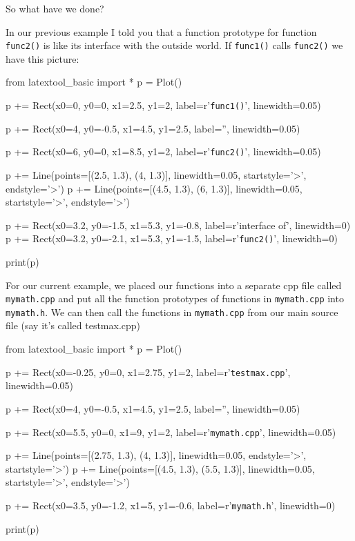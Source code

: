 
So what have we done?

In our previous example I told you that a function prototype for
function \texttt{func2()} is like its interface with the outside world. If
\texttt{func1()} calls \texttt{func2()} we have this picture:

\begin{python}
from latextool_basic import *
p = Plot()

p += Rect(x0=0, y0=0, x1=2.5, y1=2, label=r'{\tt func1()}', linewidth=0.05)

p += Rect(x0=4, y0=-0.5, x1=4.5, y1=2.5, label='', linewidth=0.05)

p += Rect(x0=6, y0=0, x1=8.5, y1=2, label=r'{\tt func2()}', linewidth=0.05)

p += Line(points=[(2.5, 1.3), (4, 1.3)], linewidth=0.05, startstyle='>', endstyle='>')
p += Line(points=[(4.5, 1.3), (6, 1.3)], linewidth=0.05, startstyle='>', endstyle='>')

p += Rect(x0=3.2, y0=-1.5, x1=5.3, y1=-0.8, label=r'{\small interface of}', linewidth=0)
p += Rect(x0=3.2, y0=-2.1, x1=5.3, y1=-1.5, label=r'{\small \texttt{func2()}}', linewidth=0)

print(p)
\end{python}

For our current example, we placed our functions into a separate cpp
file called \texttt{mymath.cpp} and put all the function prototypes of
functions in \texttt{mymath.cpp} into \texttt{mymath.h}. We can then call
the functions in \texttt{mymath.cpp} from our main source file (say
it's called testmax.cpp)

\begin{python}
from latextool_basic import *
p = Plot()

p += Rect(x0=-0.25, y0=0, x1=2.75, y1=2, label=r'{\tt testmax.cpp}', linewidth=0.05)

p += Rect(x0=4, y0=-0.5, x1=4.5, y1=2.5, label='', linewidth=0.05)

p += Rect(x0=5.5, y0=0, x1=9, y1=2, label=r'{\tt mymath.cpp}', linewidth=0.05)

p += Line(points=[(2.75, 1.3), (4, 1.3)], linewidth=0.05, endstyle='>', startstyle='>')
p += Line(points=[(4.5, 1.3), (5.5, 1.3)], linewidth=0.05, startstyle='>', endstyle='>')

p += Rect(x0=3.5, y0=-1.2, x1=5, y1=-0.6, label=r'{\tt mymath.h}', linewidth=0)

print(p)
\end{python}

